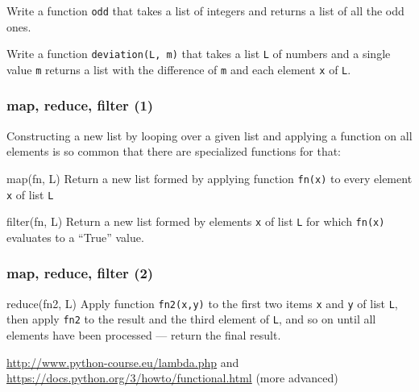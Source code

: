 \documentclass[english,serif,mathserif,xcolor=pdftex,dvipsnames,table]{beamer}
\begin{document}
\begin{frame}[fragile]
  \begin{exercise*}[7]
    Write a function \texttt{odd} that takes a list of integers and
    returns a list of all the odd ones.
  \end{exercise*}

  \+
  \begin{exercise*}[8]
    Write a function \texttt{deviation(L, m)} that takes a list \texttt{L} of
    numbers and a single value \texttt{m} returns a list with the difference of
    \texttt{m} and each element \texttt{x} of \texttt{L}.
  \end{exercise*}
\end{frame}


\begin{frame}
  \frametitle{map, reduce, filter (1)}

  Constructing a new list by looping over a given list and applying a function
  on all elements is so common that there are specialized functions for that:

  \begin{describe}{map(fn, L)}
    Return a new list formed by applying function \texttt{fn(x)} to every
    element \texttt{x} of list \texttt{L}
  \end{describe}

  \+
  \begin{describe}{filter(fn, L)}
    Return a new list formed by elements \texttt{x} of list \texttt{L} for which
    \texttt{fn(x)} evaluates to a ``True'' value.
  \end{describe}
\end{frame}

\begin{frame}
  \frametitle{map, reduce, filter (2)}

  \begin{describe}{reduce(fn2, L)}
    Apply function \texttt{fn2(x,y)} to the first two items \texttt{x} and
    \texttt{y} of list \texttt{L}, then apply \texttt{fn2} to the result and the
    third element of \texttt{L}, and so on until all elements have been
    processed --- return the final result.
  \end{describe}

  \+
  \begin{seealso}
    \url{http://www.python-course.eu/lambda.php}
    and \url{https://docs.python.org/3/howto/functional.html} (more advanced)
  \end{seealso}
\end{frame}
\end{document}
